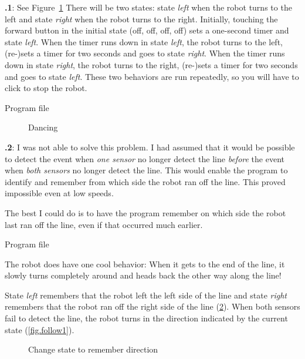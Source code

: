 \documentclass[11pt,a4paper,english]{article}
\begin{document}
\textbf{\thesection.1}: See Figure~\ref{fig.dance} There will be two
states: state \emph{left}  when the robot turns to the
left and state \emph{right}  when the robot turns to
the right. Initially, touching the forward button in the initial state
(off, off, off, off) sets a one-second timer and state \emph{left}. When
the timer runs down in state \emph{left}, the robot turns to the left,
(re-)sets a timer for two seconds and goes to state \emph{right}. When
the timer runs down in state \emph{right}, the robot turns to the right,
(re-)sets a timer for two seconds and goes to state \emph{left}. These
two behaviors are run repeatedly, so you will have to click 
to stop the robot.

{\raggedleft \hfill Program file }


\begin{figure}
\begin{center}
\caption{Dancing}\label{fig.dance}
\end{center}
\end{figure}


\textbf{\thesection.2}:
I was not able to solve this problem. I had assumed that it would be
possible to detect the event when \emph{one sensor} no longer detect the
line \emph{before} the event when \emph{both sensors} no longer detect
the line. This would enable the program to identify and remember from
which side the robot ran off the line. This proved impossible even at
low speeds.

The best I could do is to have the program remember on which side the
robot last ran off the line, even if that occurred much earlier.

{\raggedleft \hfill Program file }

The robot does have one cool behavior: When it gets to the end of the
line, it slowly turns completely around and heads back the other way
along the line!

State \emph{left}  remembers that the robot left the
left side of the line and state \emph{right} 
remembers that the robot ran off the right side of the line
(\cref{fig.follow3}).
When both sensors fail to detect the line, the robot turns in the
direction indicated by the current state (\cref{fig.follow1}).

\begin{figure}
\begin{center}
\caption{Change state to remember direction}\label{fig.follow3}
\end{center}
\end{figure}
\end{document}

